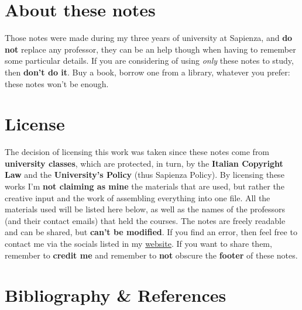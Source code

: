 \vspace{12pt}
\section*{About these notes}

Those notes were made during my three years of university at Sapienza, and \textbf{do not} replace any professor, they can be an help though when having to remember some particular details. If you are considering of using \textit{only} these notes to study, then \textbf{don't do it}. Buy a book, borrow one from a library, whatever you prefer: these notes won't be enough.

\vspace{32pt}
\section*{License}

The decision of licensing this work was taken since these notes come from \textbf{university classes}, which are protected, in turn, by the \textbf{Italian Copyright Law} and the \textbf{University's Policy} (thus Sapienza Policy). By licensing these works I'm \textbf{not claiming as mine} the materials that are used, but rather the creative input and the work of assembling everything into one file.
\nl
All the materials used will be listed here below, as well as the names of the professors (and their contact emails) that held the courses.
\nl
The notes are freely readable and can be shared, but \textbf{can't be modified}. If you find an error, then feel free to contact me via the socials listed in my \href{https://www.leonardobiason.com}{website}. If you want to share them, remember to \textbf{credit me} and remember to \textbf{not} obscure the \textbf{footer} of these notes.

\vspace{32pt}
\section*{Bibliography \texorpdfstring{\&}{&} References}

\begingroup
    \patchcmd{\thebibliography}{\chapter*}{\section*}{}{}
    \renewcommand{\section}[2]{}%
    
